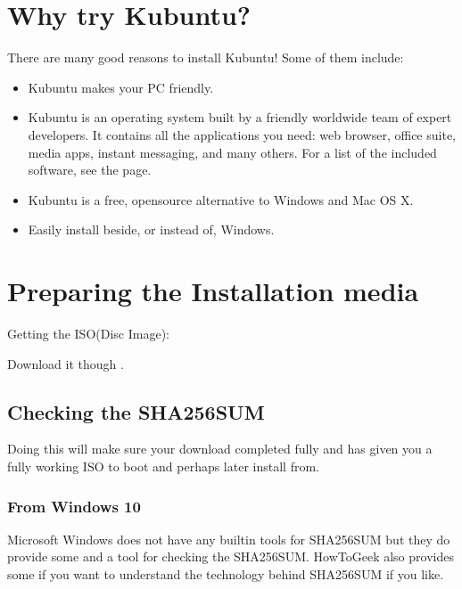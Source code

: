 \documentclass[letterpaper,10pt,english]{sphinxmanual}
\begin{document}
\section{Why try Kubuntu?}
\label{\detokenize{docs/installation:why-try-kubuntu}}
\sphinxAtStartPar
There are many good reasons to install Kubuntu!
Some of them include:
\begin{itemize}
\item {} 
\sphinxAtStartPar
Kubuntu makes your PC friendly.

\item {} 
\sphinxAtStartPar
Kubuntu is an operating system built by a friendly worldwide team of expert developers.
It contains all the applications you need: web browser, office suite, media apps,
instant messaging, and many others. For a list of the included software, see the
{\hyperref[\detokenize{docs/software:software-link}]{}} page.

\item {} 
\sphinxAtStartPar
Kubuntu is a free, open\sphinxhyphen{}source alternative to Windows and Mac OS X.

\item {} 
\sphinxAtStartPar
Easily install beside, or instead of, Windows.

\end{itemize}


\section{Preparing the Installation media}
\label{\detokenize{docs/installation:preparing-the-installation-media}}\label{\detokenize{docs/installation:get-kubuntu-link}}
\sphinxAtStartPar
Getting the ISO(Disc Image):

\sphinxAtStartPar
Download it though .


\subsection{Checking the SHA256SUM}
\label{\detokenize{docs/installation:checking-the-sha256sum}}\label{\detokenize{docs/installation:checksum-link}}
\sphinxAtStartPar
Doing this will make sure your download completed fully and has given you a fully working ISO to boot and perhaps later install from.


\subsubsection{From Windows 10}
\label{\detokenize{docs/installation:from-windows-10}}
\sphinxAtStartPar
Microsoft Windows does not have any built\sphinxhyphen{}in tools for SHA256SUM but they do
provide some  and a tool for checking the SHA256SUM. How\sphinxhyphen{}To\sphinxhyphen{}Geek also provides some  if you want to understand the technology behind SHA256SUM if you like.
\end{document}
